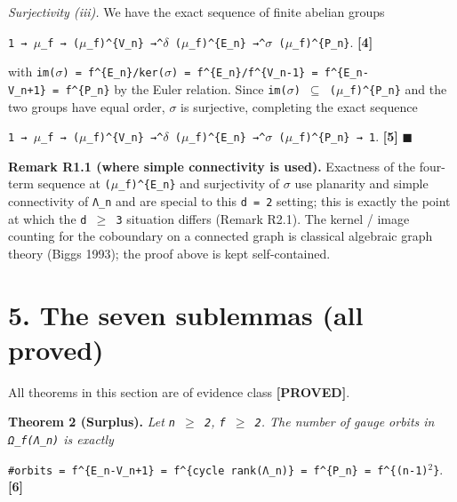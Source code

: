 \documentclass[
  american,
  11pt,
  letterpaper,
]{article}
\begin{document}
\emph{Surjectivity (iii).} We have the exact sequence of finite abelian groups

\texttt{1\ →\ \ensuremath{\mu}\_f\ →\ (\ensuremath{\mu}\_f)\^{}\{V\_n\}\ →\^{}\ensuremath{\delta}\ (\ensuremath{\mu}\_f)\^{}\{E\_n\}\ →\^{}\ensuremath{\sigma}\ (\ensuremath{\mu}\_f)\^{}\{P\_n\}}. \textbf{{[}4{]}}

with \texttt{\textbar{}im(\ensuremath{\sigma})\textbar{}\ =\ f\^{}\{\textbar{}E\_n\textbar{}\}/\textbar{}ker(\ensuremath{\sigma})\textbar{}\ =\ f\^{}\{\textbar{}E\_n\textbar{}\}/f\^{}\{\textbar{}V\_n\textbar{}-1\}\ =\ f\^{}\{\textbar{}E\_n\textbar{}-\textbar{}V\_n\textbar{}+1\}\ =\ f\^{}\{\textbar{}P\_n\textbar{}\}} by the Euler relation. Since \texttt{im(\ensuremath{\sigma})\ \ensuremath{\subseteq}\ (\ensuremath{\mu}\_f)\^{}\{P\_n\}} and the two groups have equal order, \texttt{\ensuremath{\sigma}} is surjective, completing the exact sequence

\texttt{1\ →\ \ensuremath{\mu}\_f\ →\ (\ensuremath{\mu}\_f)\^{}\{V\_n\}\ →\^{}\ensuremath{\delta}\ (\ensuremath{\mu}\_f)\^{}\{E\_n\}\ →\^{}\ensuremath{\sigma}\ (\ensuremath{\mu}\_f)\^{}\{P\_n\}\ →\ 1}. \textbf{{[}5{]}} \ensuremath{\blacksquare}

\textbf{Remark R1.1 (where simple connectivity is used).} Exactness of the four-term sequence at \texttt{(\ensuremath{\mu}\_f)\^{}\{E\_n\}} and surjectivity of \texttt{\ensuremath{\sigma}} use planarity and simple connectivity of \texttt{Λ\_n} and are special to this \texttt{d\ =\ 2} setting; this is exactly the point at which the \texttt{d\ \ensuremath{\geq}\ 3} situation differs (Remark R2.1). The kernel / image counting for the coboundary on a connected graph is classical algebraic graph theory (Biggs 1993); the proof above is kept self-contained.

\section{5. The seven sublemmas (all proved)}\label{the-seven-sublemmas-all-proved}

All theorems in this section are of evidence class \textbf{{[}PROVED{]}}.

\textbf{Theorem 2 (Surplus).} \emph{Let \texttt{n\ \ensuremath{\geq}\ 2}, \texttt{f\ \ensuremath{\geq}\ 2}. The number of gauge orbits in \texttt{Ω\_f(Λ\_n)} is exactly}

\texttt{\#orbits\ =\ f\^{}\{\textbar{}E\_n\textbar{}-\textbar{}V\_n\textbar{}+1\}\ =\ f\^{}\{cycle\ rank(Λ\_n)\}\ =\ f\^{}\{\textbar{}P\_n\textbar{}\}\ =\ f\^{}\{(n-1)\ensuremath{{}^{2}}\}}. \textbf{{[}6{]}}
\end{document}
